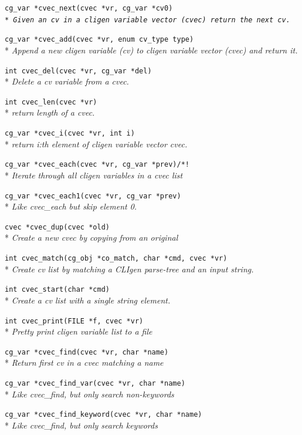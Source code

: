 \documentclass[a4paper, 10pt] {article}
\begin{document}
{\tt cg\_var *cvec\_next(cvec *vr, cg\_var *cv0)\\*
\emph{  Given an cv in a cligen variable vector (cvec) return the next cv.}

{\tt cg\_var *cvec\_add(cvec *vr, enum cv\_type type)}\\*
\emph{  Append a new cligen variable (cv) to cligen variable vector (cvec) and return it.}

{\tt int cvec\_del(cvec *vr, cg\_var *del)}\\*
\emph{  Delete a cv variable from a cvec.}

{\tt int cvec\_len(cvec *vr)}\\*
\emph{ return length of a cvec.}

{\tt cg\_var *cvec\_i(cvec *vr, int i)}\\*
\emph{ return i:th element of cligen variable vector cvec.}

{\tt cg\_var *cvec\_each(cvec *vr, cg\_var *prev)/*! }\\*
\emph{ Iterate through all cligen variables in a cvec list}

{\tt cg\_var *cvec\_each1(cvec *vr, cg\_var *prev)}\\*
\emph{ Like cvec\_each but skip element 0. }

{\tt cvec *cvec\_dup(cvec *old)}\\*
\emph{  Create a new cvec by copying from an original}

{\tt int cvec\_match(cg\_obj *co\_match, char   *cmd, cvec   *vr)}\\*
\emph{ Create cv list by matching a CLIgen parse-tree and an input string. }

{\tt int cvec\_start(char   *cmd)}\\*
\emph{ Create a cv list with a single string element. }

{\tt int cvec\_print(FILE *f, cvec *vr)}\\*
\emph{ Pretty print cligen variable list to a file}

{\tt cg\_var *cvec\_find(cvec *vr, char *name)}\\*
\emph{ Return first cv in a cvec matching a name}

{\tt cg\_var *cvec\_find\_var(cvec *vr, char *name)}\\*
\emph{  Like cvec\_find, but only search non-keywords}

{\tt cg\_var *cvec\_find\_keyword(cvec *vr, char *name)}\\*
\emph{ Like cvec\_find, but only search keywords}

}
\end{document}
